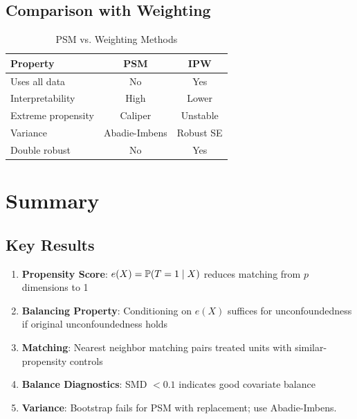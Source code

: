 \subsection{Comparison with Weighting}

\begin{table}[ht]
\centering
\caption{PSM vs. Weighting Methods}
\label{tab:psm_vs_weight}
\begin{tabular}{lcc}
\toprule
\textbf{Property} & \textbf{PSM} & \textbf{IPW} \\
\midrule
Uses all data & No & Yes \\
Interpretability & High & Lower \\
Extreme propensity & Caliper & Unstable \\
Variance & Abadie-Imbens & Robust SE \\
Double robust & No & Yes \\
\bottomrule
\end{tabular}
\end{table}


\section{Summary}
\label{sec:psm_summary}

\subsection{Key Results}

\begin{enumerate}
    \item \textbf{Propensity Score}: $e(X) = \mathbb{P}(T=1 \mid X)$ reduces matching from $p$ dimensions to 1

    \item \textbf{Balancing Property}: Conditioning on $e(X)$ suffices for unconfoundedness if original unconfoundedness holds

    \item \textbf{Matching}: Nearest neighbor matching pairs treated units with similar-propensity controls

    \item \textbf{Balance Diagnostics}: SMD $< 0.1$ indicates good covariate balance

    \item \textbf{Variance}: Bootstrap fails for PSM with replacement; use Abadie-Imbens.
\end{enumerate}

